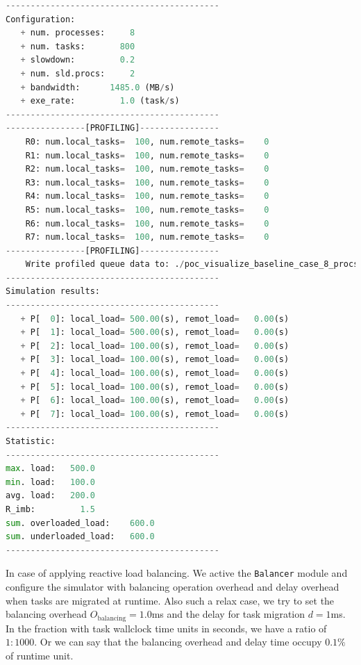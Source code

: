 \begin{lstlisting}[language=Python, caption={The simulation output of the baseline case}, label={lst:sim_output_sample}]
-------------------------------------------
Configuration:
   + num. processes:     8
   + num. tasks:       800
   + slowdown:         0.2
   + num. sld.procs:     2
   + bandwidth:      1485.0 (MB/s)
   + exe_rate:         1.0 (task/s)
-------------------------------------------
----------------[PROFILING]----------------
	R0: num.local_tasks=  100, num.remote_tasks=    0
	R1: num.local_tasks=  100, num.remote_tasks=    0
	R2: num.local_tasks=  100, num.remote_tasks=    0
	R3: num.local_tasks=  100, num.remote_tasks=    0
	R4: num.local_tasks=  100, num.remote_tasks=    0
	R5: num.local_tasks=  100, num.remote_tasks=    0
	R6: num.local_tasks=  100, num.remote_tasks=    0
	R7: num.local_tasks=  100, num.remote_tasks=    0
----------------[PROFILING]----------------
	Write profiled queue data to: ./poc_visualize_baseline_case_8_procs_output.csv
-------------------------------------------
Simulation results:
-------------------------------------------
   + P[  0]: local_load= 500.00(s), remot_load=   0.00(s)
   + P[  1]: local_load= 500.00(s), remot_load=   0.00(s)
   + P[  2]: local_load= 100.00(s), remot_load=   0.00(s)
   + P[  3]: local_load= 100.00(s), remot_load=   0.00(s)
   + P[  4]: local_load= 100.00(s), remot_load=   0.00(s)
   + P[  5]: local_load= 100.00(s), remot_load=   0.00(s)
   + P[  6]: local_load= 100.00(s), remot_load=   0.00(s)
   + P[  7]: local_load= 100.00(s), remot_load=   0.00(s)
-------------------------------------------
Statistic:
-------------------------------------------
max. load:   500.0
min. load:   100.0
avg. load:   200.0
R_imb:         1.5
sum. overloaded_load:    600.0
sum. underloaded_load:   600.0
-------------------------------------------
\end{lstlisting}
\hfill

In case of applying reactive load balancing. We active the \texttt{Balancer} module and configure the simulator with balancing operation overhead and delay overhead when tasks are migrated at runtime. Also such a relax case, we try to set the balancing overhead $O_{\text{balancing}} = 1.0$ms and the delay for task migration $d=1$ms. In the fraction with task wallclock time units in seconds, we have a ratio of $1:1000$. Or we can say that the balancing overhead and delay time occupy $0.1\%$ of runtime unit.\\

